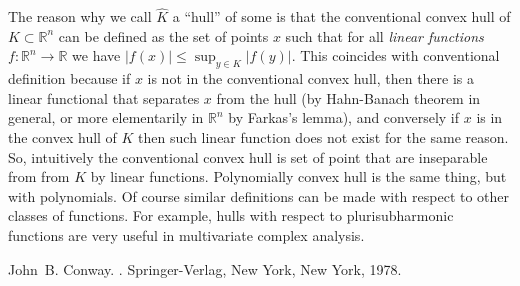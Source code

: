\documentclass[12pt]{article}
\theoremstyle{theorem}
\theoremstyle{definition}
\begin{document}
The reason why we call $\hat{K}$ a ``hull'' of some  is that the conventional convex hull of $K \subset {\mathbb{R}}^n$ can be defined as the set of points $x$ such that for all \emph{linear functions} $f \colon {\mathbb{R}}^n\to \mathbb{R}$ we have $\lvert f(x) \rvert \leq \sup_{y\in K} \lvert f(y) \rvert$.  This coincides with conventional definition because if $x$ is not in the conventional convex hull, then there is a linear functional that separates $x$ from the hull (by Hahn-Banach theorem in general, or more elementarily in ${\mathbb{R}}^n$ by Farkas's lemma), and conversely if $x$ is in the convex hull of $K$ then such linear function does not exist for the same reason.  So, intuitively the conventional convex hull is set of point that are inseparable from from $K$ by linear functions.  Polynomially convex hull is the same thing, but with polynomials.
Of course similar definitions can be made with respect to other classes of functions.  For example, hulls with respect to plurisubharmonic functions are very useful in multivariate complex analysis.

\begin{thebibliography}{9}
John~B. Conway.
{\em {}}.
Springer-Verlag, New York, New York, 1978.
\end{thebibliography}
\end{document}
